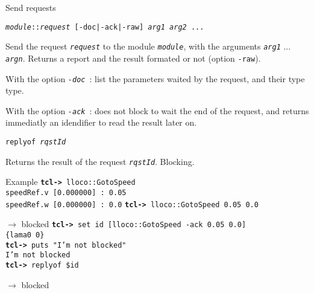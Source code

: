 \documentclass[a4paper,landscape,smooth]{show}
\begin{document}

\begin{tslide}{Send requests}
   \vfill
   \begin{cartouche}
      \tt {\em module}::{\em request} [-doc|-ack|-raw] {\em arg1} {\em arg2} ...
   \end{cartouche}
   Send the request {\tt\em request} to the module {\tt\em module}, with the
   arguments {\tt\em arg1} ... {\tt\em argn}. Returns a report and the
   result formated or not (option {\tt -raw}).

   With the option {\tt\em -doc}~: list the parameters waited by the
   request, and their type type.

   With the option {\tt\em -ack}~: does not block to wait the end of
   the request, and returns immediatly an idendifier to read the result
   later on.

   \vfill
   \begin{cartouche}
      \tt replyof {\em rqstId}
   \end{cartouche}
   Returns the result of the request {\tt\em rqstId}. Blocking.
   \vfill
\end{tslide}


\begin{tslide}{Example}
   \vfill
   {\tt {\bf tcl->} lloco::GotoSpeed\\
   speedRef.v [0.000000] : 0.05\\
   speedRef.w [0.000000] : 0.0}
   \vfill
   {\tt {\bf tcl->} lloco::GotoSpeed 0.05 0.0}

   $\rightarrow$ blocked
   \vfill
   {\tt {\bf tcl->} set id [lloco::GotoSpeed -ack 0.05 0.0]\\
	\{lama0 0\}\\
	{\bf tcl->} puts "I'm not blocked"\\
	I'm not blocked\\
	{\bf tcl->} replyof \$id}

   $\rightarrow$ blocked
   \vfill
\end{tslide}

\end{document}

